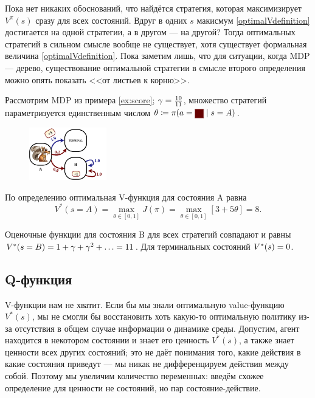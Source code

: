 Пока нет никаких обоснований, что найдётся стратегия, которая максимизирует $V^{\pi}(s)$ сразу для всех состояний. Вдруг в одних $s$ макисмум \eqref{optimalVdefinition} достигается на одной стратегии, а в другом --- на другой? Тогда оптимальных стратегий в сильном смысле вообще не существует, хотя существует формальная величина \eqref{optimalVdefinition}. Пока заметим лишь, что для ситуации, когда MDP --- дерево, существование оптимальной стратегии в смысле второго определения можно опять показать <<от листьев к корню>>. 

\begin{example}
Рассмотрим MDP из примера \ref{ex:score}; $\gamma \HM= \frac{10}{11}$, множество стратегий параметризуется единственным числом $\theta \HM\coloneqq \pi(a \HM= \text{\colorsquare{ChadRed}} \HM\mid s \HM= A)$.

\begin{figure}
\centering
\vspace{-0.8cm}
\includegraphics[width=0.3\textwidth]{Images/Score.png}
\vspace{-1cm}
\end{figure}

По определению оптимальная V-функция для состояния A равна 
$$V^*(s = A) = \max\limits_{\theta \in [0, 1]} J(\pi) = \max\limits_{\theta \in [0, 1]} \left[ 3 + 5\theta \right] = 8.$$

Оценочные функции для состояния B для всех стратегий совпадают и равны $V^*(s \HM= B) \HM= 1 \HM+ \gamma \HM+ \gamma^2 \HM+ \dots \HM= 11$. Для терминальных состояний $V^*(s) \HM= 0$.
\end{example}

\subsection{Q-функция}

V-функции нам не хватит. Если бы мы знали оптимальную value-функцию $V^*(s)$, мы не смогли бы восстановить хоть какую-то оптимальную политику из-за отсутствия в общем случае информации о динамике среды. Допустим, агент находится в некотором состоянии и знает его ценность $V^*(s)$, а также знает ценности всех других состояний; это не даёт понимания того, какие действия в какие состояния приведут --- мы никак не дифференцируем действия между собой. Поэтому мы увеличим количество переменных: введём схожее определение для ценности не состояний, но пар состояние-действие. 

